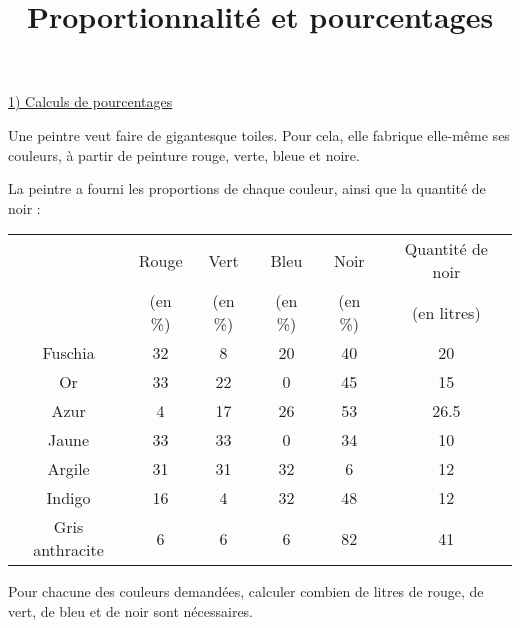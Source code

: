 \documentclass[
	a4paper,
	classe=1STI2D,
	exercices=Activité
]{exercice}
\title{Proportionnalité et pourcentages}
\begin{document}
\maketitle

{\large\uline{1) Calculs de pourcentages}}

Une peintre veut faire de gigantesque toiles. Pour cela, elle fabrique elle-même ses couleurs, à partir de peinture rouge, verte, bleue et noire.

La peintre a fourni les proportions de chaque couleur, ainsi que la quantité de noir :

\begin{center}
	\begin{tabular}{|c|c|c|c|c||c|}
		\hline
		                & Rouge   & Vert    & Bleu    & Noir    & Quantité de noir \\
		                & (en \%) & (en \%) & (en \%) & (en \%) & (en litres)      \\ \hline
		Fuschia         & 32      & 8       & 20      & 40      & 20               \\ \hline
		Or              & 33      & 22      & 0       & 45      & 15               \\ \hline
		Azur            & 4       & 17      & 26      & 53      & 26.5             \\ \hline
		Jaune           & 33      & 33      & 0       & 34      & 10               \\ \hline
		Argile          & 31      & 31      & 32      & 6       & 12               \\ \hline
		Indigo          & 16      & 4       & 32      & 48      & 12               \\ \hline
		Gris anthracite & 6       & 6       & 6       & 82      & 41               \\ \hline
	\end{tabular}
\end{center}

Pour chacune des couleurs demandées, calculer combien de litres de rouge, de vert, de bleu et de noir sont nécessaires.

\vspace{2em}
\end{document}
